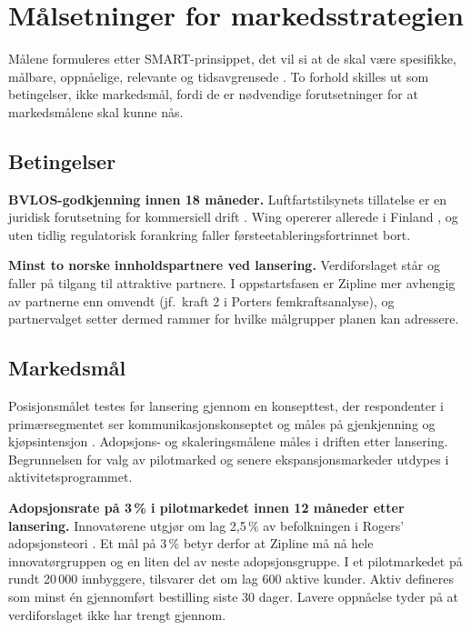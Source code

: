 \section{Målsetninger for markedsstrategien}
\label{sec:malsetninger}

Målene formuleres etter SMART-prinsippet, det vil si at de skal være
spesifikke, målbare, oppnåelige, relevante og tidsavgrensede
\parencite{kotlerkeller2016}. To forhold skilles ut som betingelser, ikke
markedsmål, fordi de er nødvendige forutsetninger for at markedsmålene
skal kunne nås.

\subsection{Betingelser}

\textbf{BVLOS-godkjenning innen 18 måneder.}
Luftfartstilsynets tillatelse er en juridisk forutsetning for kommersiell
drift \parencite{luftfartstilsynet2023}. Wing opererer allerede i Finland
\parencite{wing2024}, og uten tidlig regulatorisk forankring faller
førsteetableringsfortrinnet bort.

\textbf{Minst to norske innholdspartnere ved lansering.}
Verdiforslaget står og faller på tilgang til attraktive partnere. I
oppstartsfasen er Zipline mer avhengig av partnerne enn omvendt (jf.\
kraft 2 i Porters femkraftsanalyse), og partnervalget setter dermed
rammer for hvilke målgrupper planen kan adressere.

\subsection{Markedsmål}

Posisjonsmålet testes før lansering gjennom en konsepttest, der respondenter
i primærsegmentet ser kommunikasjonskonseptet og måles på gjenkjenning og
kjøpsintensjon \parencite{kotlerkeller2016}. Adopsjons- og skaleringsmålene
måles i driften etter lansering. Begrunnelsen for valg av pilotmarked og 
senere ekspansjonsmarkeder utdypes i aktivitetsprogrammet.

\textbf{Adopsjonsrate på 3\,\% i pilotmarkedet innen 12 måneder etter
lansering.}
Innovatørene utgjør om lag 2{,}5\,\% av befolkningen i Rogers'
adopsjonsteori \parencite{rogers2003}. Et mål på 3\,\% betyr derfor at
Zipline må nå hele innovatørgruppen og en liten del av neste
adopsjonsgruppe. I et pilotmarkedet på rundt 20\,000 innbyggere, 
tilsvarer det om lag 600 aktive kunder. Aktiv
defineres som minst én gjennomført bestilling siste 30 dager. Lavere
oppnåelse tyder på at verdiforslaget ikke har trengt gjennom.

